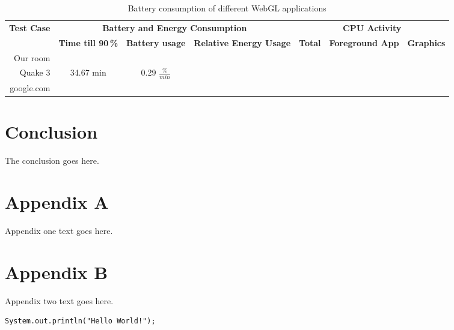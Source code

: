 \documentclass[12pt,journal,compsoc]{IEEEtran}
\begin{document}
\begin{table*}[tb]
	\begin{centering}
	\begin{tabular}{r|c|c|c|c|c|c}
		\multirow{2}{*}{\textbf{Test Case}} & \multicolumn{3}{c|}{\textbf{Battery and Energy Consumption}}						 & \multicolumn{3}{c}{\textbf{CPU Activity}}					\\
 							&\textbf{Time till 90\,\%} & \textbf{Battery usage}	& \textbf{Relative Energy Usage} & \textbf{Total} 	& \textbf{Foreground App} 		& \textbf{Graphics}	\\
		\hline
		Our room		   &							&						&								&					&								&					\\
		Quake 3			   &	34.67 min				& 0.29 $\frac{\%}{min}$	&								&					&								&					\\
		google.com		   &							&						&								&					&								&					\\
	\end{tabular}
	\caption{Battery consumption of different WebGL applications\label{batteryTable}}
	\end{centering}
\end{table*}

\section{Conclusion}
The conclusion goes here.





\appendices
\section*{Appendix A}

Appendix one text goes here.

\section*{Appendix B}
Appendix two text goes here.

\begin{lstlisting}[label=code:hello_world, caption={Hello World Code Snippet}]
System.out.println("Hello World!");
\end{lstlisting}

\ifCLASSOPTIONcaptionsoff
  \newpage
\fi





\end{document}
